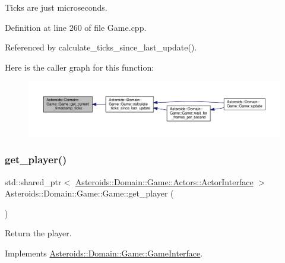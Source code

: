 Ticks are just microseconds. 



Definition at line 260 of file Game.\+cpp.



Referenced by calculate\+\_\+ticks\+\_\+since\+\_\+last\+\_\+update().

Here is the caller graph for this function\+:\nopagebreak
\begin{figure}[H]
\begin{center}
\leavevmode
\includegraphics[width=350pt]{classAsteroids_1_1Domain_1_1Game_1_1Game_a0a4efa785b7cdd6b0ef19478f8d34617_icgraph}
\end{center}
\end{figure}
\mbox{\label{classAsteroids_1_1Domain_1_1Game_1_1Game_ae036a59145a83f0e66e91acce693035b}} 
\subsubsection{\texorpdfstring{get\+\_\+player()}{get\_player()}}
{\footnotesize\ttfamily std\+::shared\+\_\+ptr$<$ \hyperlink{classAsteroids_1_1Domain_1_1Game_1_1Actors_1_1ActorInterface}{Asteroids\+::\+Domain\+::\+Game\+::\+Actors\+::\+Actor\+Interface} $>$ Asteroids\+::\+Domain\+::\+Game\+::\+Game\+::get\+\_\+player (\begin{DoxyParamCaption}{ }\end{DoxyParamCaption})\hspace{0.3cm}{\ttfamily [virtual]}}



Return the player. 



Implements \hyperlink{classAsteroids_1_1Domain_1_1Game_1_1GameInterface_aa542e72a3e9063ab44be7bf44550f8db}{Asteroids\+::\+Domain\+::\+Game\+::\+Game\+Interface}.



